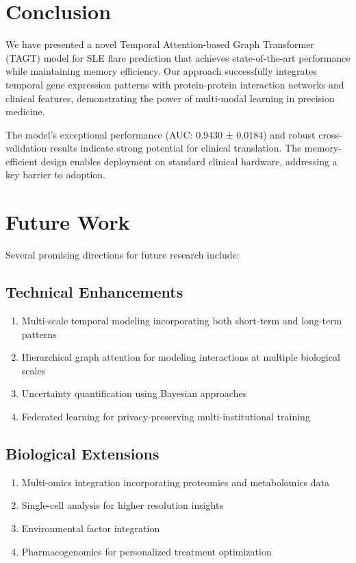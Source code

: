 \documentclass[10pt,twocolumn]{article}
\begin{document}
\section{Conclusion}

We have presented a novel Temporal Attention-based Graph Transformer (TAGT) model for SLE flare prediction that achieves state-of-the-art performance while maintaining memory efficiency. Our approach successfully integrates temporal gene expression patterns with protein-protein interaction networks and clinical features, demonstrating the power of multi-modal learning in precision medicine.

The model's exceptional performance (AUC: 0.9430 ± 0.0184) and robust cross-validation results indicate strong potential for clinical translation. The memory-efficient design enables deployment on standard clinical hardware, addressing a key barrier to adoption.

\section{Future Work}

Several promising directions for future research include:

\subsection{Technical Enhancements}
\begin{enumerate}
\item Multi-scale temporal modeling incorporating both short-term and long-term patterns
\item Hierarchical graph attention for modeling interactions at multiple biological scales
\item Uncertainty quantification using Bayesian approaches
\item Federated learning for privacy-preserving multi-institutional training
\end{enumerate}

\subsection{Biological Extensions}
\begin{enumerate}
\item Multi-omics integration incorporating proteomics and metabolomics data
\item Single-cell analysis for higher resolution insights
\item Environmental factor integration
\item Pharmacogenomics for personalized treatment optimization
\end{enumerate}
\end{document}
